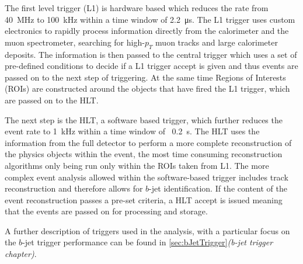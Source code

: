 The first level trigger (L1) is hardware based which reduces the rate from 40~MHz to 100~kHz within a time window of \SI{2.2}{\micro\second}.
The L1 trigger uses custom electronics to rapidly process information directly from the
calorimeter and the muon spectrometer, searching for high-$p_{T}$ muon tracks and large calorimeter deposits.
The information is then passed to the central trigger which uses a set of pre-defined conditions
to decide if a L1 trigger accept is given and thus events are passed on to the next step of triggering.
At the same time Regions of Interests (ROIs) are constructed around the objects that have fired the L1 trigger,
which are passed on to the HLT. 

The next step is the HLT, a software based trigger,
which further reduces the event rate to 1~kHz within a time window of ~\SI{0.2}{\second}.
The HLT uses the information from the full detector
to perform a more complete reconstruction of the physics objects within the event,
the most time consuming reconstruction algorithms only being run only within the ROIs taken from L1.
The more complex event analysis allowed within the software-based trigger includes
track reconstruction and therefore allows for $b$-jet identification.
If the content of the event reconstruction passes a pre-set criteria, a HLT accept is issued
meaning that the events are passed on for processing and storage. 

A further description of triggers used in the analysis,
with a particular focus on the $b$-jet trigger performance
can be found in \ref{sec:bJetTrigger}\textit{(b-jet trigger chapter)}.

